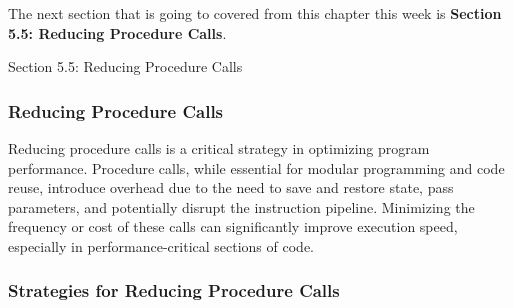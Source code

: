 The next section that is going to covered from this chapter this week is \textbf{Section 5.5: Reducing Procedure Calls}.

\begin{notes}{Section 5.5: Reducing Procedure Calls}
    \subsubsection*{Reducing Procedure Calls}

    Reducing procedure calls is a critical strategy in optimizing program performance. Procedure calls, while essential for modular programming and code reuse, introduce overhead due to the need to save 
    and restore state, pass parameters, and potentially disrupt the instruction pipeline. Minimizing the frequency or cost of these calls can significantly improve execution speed, especially in 
    performance-critical sections of code. \vspace*{1em}
    
    \subsubsection*{Strategies for Reducing Procedure Calls}
    

\end{notes}
